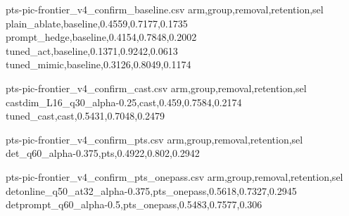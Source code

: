 \begin{filecontents*}[overwrite]{pts-pic-frontier_v4_confirm_baseline.csv}
arm,group,removal,retention,sel
plain_ablate,baseline,0.4559,0.7177,0.1735
prompt_hedge,baseline,0.4154,0.7848,0.2002
tuned_act,baseline,0.1371,0.9242,0.0613
tuned_mimic,baseline,0.3126,0.8049,0.1174
\end{filecontents*}
\begin{filecontents*}[overwrite]{pts-pic-frontier_v4_confirm_cast.csv}
arm,group,removal,retention,sel
castdim_L16_q30_alpha-0.25,cast,0.459,0.7584,0.2174
tuned_cast,cast,0.5431,0.7048,0.2479
\end{filecontents*}
\begin{filecontents*}[overwrite]{pts-pic-frontier_v4_confirm_pts.csv}
arm,group,removal,retention,sel
det_q60_alpha-0.375,pts,0.4922,0.802,0.2942
\end{filecontents*}
\begin{filecontents*}[overwrite]{pts-pic-frontier_v4_confirm_pts_onepass.csv}
arm,group,removal,retention,sel
detonline_q50_at32_alpha-0.375,pts_onepass,0.5618,0.7327,0.2945
detprompt_q60_alpha-0.5,pts_onepass,0.5483,0.7577,0.306
\end{filecontents*}
